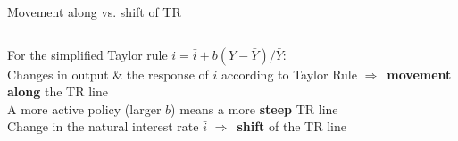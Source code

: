 \documentclass{beamer}
\newcommand{\rarr}{$\Rightarrow$\ }
\begin{document}
\begin{frame}{Movement along vs. shift of TR}


\begin{columns}
     For the simplified Taylor rule $i = \bar{i} + b\left(Y-\bar{Y}\right)/\bar{Y}$: \\ 
    \vspace{0.5cm}
    Changes in output \& the response of $i$ according to Taylor Rule \rarr \textbf{movement along} the TR line \\
    \vspace{0.5cm}
    A more active policy (larger $b$) means a more \textbf{steep} TR line \\
    \vspace{0.5cm}
    Change in the natural interest rate $\bar i$ \rarr \textbf{shift} of the TR line
\end{columns}


\end{frame}
\end{document}

